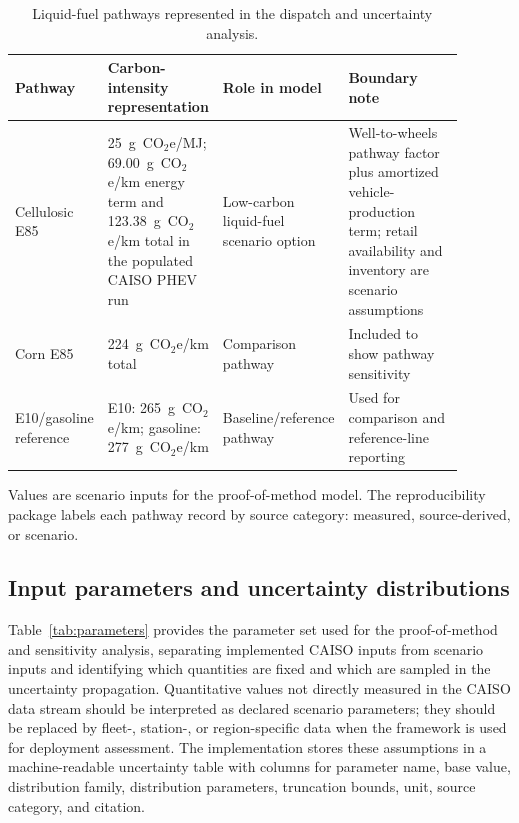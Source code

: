 \documentclass[cleantechnol,article,submit,pdftex,moreauthors]{Definitions/mdpi}
\newcommand{\gcoeqkm}{g~CO$_2$e/km}
\begin{document}
\begin{table}[htbp]
	\centering
	\begin{threeparttable}
		\caption{Liquid-fuel pathways represented in the dispatch and uncertainty analysis.}
		\label{tab:fuel_pathways}
		\scriptsize
		\begin{tabular}{p{0.20\linewidth}p{0.22\linewidth}p{0.20\linewidth}p{0.27\linewidth}}
			\toprule
			Pathway & Carbon-intensity representation & Role in model & Boundary note \\
			\midrule
			Cellulosic E85 & 25~g~CO$_2$e/MJ; 69.00~\gcoeqkm{} energy term and 123.38~\gcoeqkm{} total in the populated CAISO PHEV run & Low-carbon liquid-fuel scenario option & Well-to-wheels pathway factor plus amortized vehicle-production term; retail availability and inventory are scenario assumptions \\
			Corn E85 & 224~g~CO$_2$e/km total & Comparison pathway & Included to show pathway sensitivity \\
			E10/gasoline reference & E10: 265~g~CO$_2$e/km; gasoline: 277~g~CO$_2$e/km & Baseline/reference pathway & Used for comparison and reference-line reporting \\
			\bottomrule
		\end{tabular}
		\begin{tablenotes}
			\footnotesize
			\item Values are scenario inputs for the proof-of-method model. The reproducibility package labels each pathway record by source category: measured, source-derived, or scenario.
		\end{tablenotes}
	\end{threeparttable}
\end{table}


\subsection{Input parameters and uncertainty distributions}
\label{subsec:parameters}

Table~\ref{tab:parameters} provides the parameter set used for the proof-of-method and sensitivity analysis, separating implemented CAISO inputs from scenario inputs and identifying which quantities are fixed and which are sampled in the uncertainty propagation. Quantitative values not directly measured in the CAISO data stream should be interpreted as declared scenario parameters; they should be replaced by fleet-, station-, or region-specific data when the framework is used for deployment assessment. The implementation stores these assumptions in a machine-readable uncertainty table with columns for parameter name, base value, distribution family, distribution parameters, truncation bounds, unit, source category, and citation.
\end{document}
